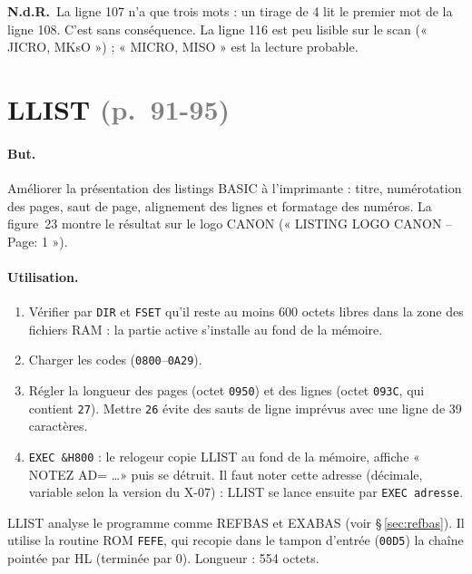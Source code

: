 \documentclass[a4paper,10pt]{article}
\newcommand{\hex}[1]{\texttt{#1}}
\newcommand{\pg}[1]{\texorpdfstring{\textcolor{gray}{\small(p.~#1)}}{}}
\newcommand{\nota}[1]{\textcolor{red!60!black}{\small\textbf{N.d.R.}~#1}}
\begin{document}
\nota{La ligne 107 n'a que trois mots : un tirage de 4 lit le premier mot de
la ligne 108. C'est sans conséquence. La ligne 116 est peu lisible sur le
scan (« JICRO, MKsO ») ; « MICRO, MISO » est la lecture probable.}

\section{LLIST \pg{91-95}}

\paragraph{But.} Améliorer la présentation des listings BASIC à
l'imprimante : titre, numérotation des pages, saut de page, alignement des
lignes et formatage des numéros. La figure~23 montre le résultat sur le logo
CANON (« LISTING LOGO CANON -- Page: 1 »).

\paragraph{Utilisation.}
\begin{enumerate}
  \item Vérifier par \texttt{DIR} et \texttt{FSET} qu'il reste au moins
        600 octets libres dans la zone des fichiers RAM : la partie active
        s'installe au fond de la mémoire.
  \item Charger les codes (\hex{0800}--\hex{0A29}).
  \item Régler la longueur des pages (octet \hex{0950}) et des lignes (octet
        \hex{093C}, qui contient \hex{27}). Mettre \hex{26} évite des sauts
        de ligne imprévus avec une ligne de 39 caractères.
  \item \texttt{EXEC \&H800} : le relogeur copie LLIST au fond de la
        mémoire, affiche « NOTEZ AD= \dots » puis se détruit. Il faut noter
        cette adresse (décimale, variable selon la version du X-07) : LLIST
        se lance ensuite par \texttt{EXEC adresse}.
\end{enumerate}
LLIST analyse le programme comme REFBAS et EXABAS (voir
§\,\ref{sec:refbas}). Il utilise la routine ROM \hex{FEFE}, qui recopie dans
le tampon d'entrée (\hex{00D5}) la chaîne pointée par HL (terminée par 0).
Longueur : 554 octets.
\end{document}
